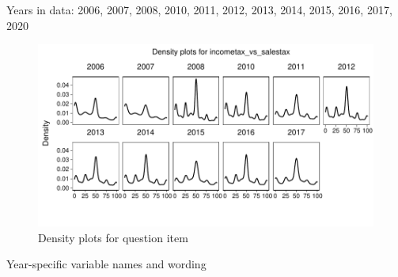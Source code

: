 \documentclass[
  12pt]{article}
\begin{document}
Years in data: 2006, 2007, 2008, 2010, 2011, 2012, 2013, 2014, 2015,
2016, 2017, 2020

\begin{figure}

{\centering \includegraphics{guide_cumulative_ces_policy_preferences_files/figure-latex/unnamed-chunk-5-2} 

}

\caption{Density plots for question item}\label{fig:unnamed-chunk-5-2}
\end{figure}

Year-specific variable names and
wording\begingroup\fontsize{11}{13}\selectfont
\end{document}
